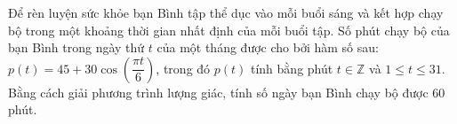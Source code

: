 \begin{bt}%
Để rèn luyện sức khỏe bạn Bình tập thể dục vào mỗi buổi sáng  và kết hợp chạy bộ trong một khoảng thời gian nhất định của mỗi buổi tập. Số phút chạy bộ của bạn Bình trong ngày thứ $t$ của một tháng được cho bởi hàm số sau: $p(t)=45+30 \cos \left(\dfrac{\pi t}{6}\right)$, trong đó $p(t)$ tính bằng phút $t\in \mathbb{Z}$ và $1 \leq t \leq 31$. Bằng cách giải phương trình lượng giác, tính số ngày bạn Bình chạy bộ được $60$ phút.
\end{bt}

